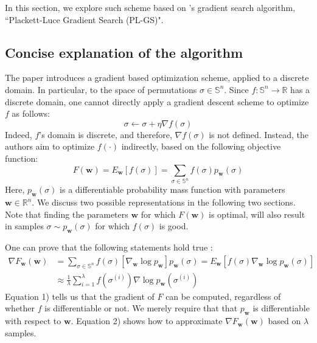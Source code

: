 \documentclass[a4paper,10pt]{article}
\begin{document}
	In this section, we explore such scheme based on \citeauthor{santucci_gradient_2020}'s gradient search algorithm, ``Plackett-Luce Gradient Search (PL-GS)".
	
	\subsection{Concise explanation of the algorithm}
	The paper introduces a gradient based optimization scheme, applied to a discrete domain. In particular, to the space of permutations $\sigma \in \mathbb{S}^n$. 
	Since $f : \mathbb{S}^n \rightarrow \mathbb{R}$ has a discrete domain, one cannot directly apply a gradient descent scheme to optimize $f$ as follows:
	$$
	\sigma \leftarrow \sigma + \eta \nabla f(\sigma)
	$$
	Indeed, $f$'s domain is discrete, and therefore, $\nabla f(\sigma)$ is not defined. Instead, the authors aim to optimize $f(\cdot)$ indirectly, based on the following objective function:
	$$F(\mathbf{w}) = E_\mathbf{w}[f(\sigma)] = \sum_{\sigma \in \mathbb{S}^n} f(\sigma) p_\mathbf{w}(\sigma)$$
	Here, $p_\mathbf{w}(\sigma)$ is a differentiable probability mass function with parameters $\mathbf{w} \in \mathbb{R}^n$. We discuss two possible representations in the following two sections. Note that finding the parameters $\mathbf{w}$ for which $F(\mathbf{w})$ is optimal, will also result in samples $\sigma \sim p_\mathbf{w}(\sigma)$ for which $f(\sigma)$ is good.
	
	One can prove that the following statements hold true \citep{santucci_gradient_2020}:
	\begin{align}
	\nabla F_\mathbf{w}(\mathbf{w}) & = \sum_{\sigma \in \mathbb{S}^n} f(\sigma) \left[ \nabla_\mathbf{w} \log p_\mathbf{w}\right] p_\mathbf{w}(\sigma) = E_\mathbf{w} \left[f(\sigma) \nabla_\mathbf{w} \log p_\mathbf{w}(\sigma) \right] \\
									& \approx \frac{1}{\lambda} \sum_{i=1}^{\lambda} f(\sigma^{(i)}) \nabla \log p_\mathbf{w}(\sigma^{(i)})
	\end{align}
	Equation 1) tells us that the gradient of $F$ can be computed, regardless of whether $f$ is differentiable or not. We merely require that that $p_\mathbf{w}$ is differentiable with respect to $\mathbf{w}$. Equation 2) shows how to approximate $\nabla F_\mathbf{w}(\mathbf{w})$ based on $\lambda$ samples.
	
	
	
\end{document}
